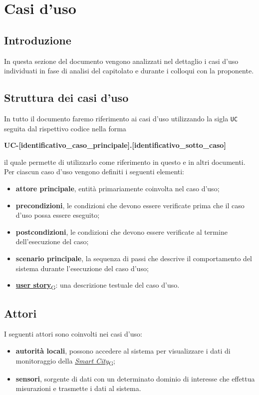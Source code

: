 \section{Casi d'uso}
\subsection{Introduzione}
In questa sezione del documento vengono analizzati nel dettaglio i casi d'uso individuati in fase di analisi del capitolato e durante i colloqui con la proponente.

\subsection{Struttura dei casi d'uso}
In tutto il documento faremo riferimento ai casi d'uso utilizzando la sigla \texttt{UC} seguita dal rispettivo codice nella forma
\begin{center}
	\textbf{UC-[identificativo\_caso\_principale].[identificativo\_sotto\_caso]}
\end{center}
il quale permette di utilizzarlo come riferimento in questo e in altri documenti.\\
Per ciascun caso d'uso vengono definiti i seguenti elementi:
\begin{itemize}
	\item \textbf{attore principale}, entità primariamente coinvolta nel caso d'uso;
	\item \textbf{precondizioni}, le condizioni che devono essere verificate prima che il caso d'uso possa essere eseguito;
	\item \textbf{postcondizioni}, le condizioni che devono essere verificate al termine dell'esecuzione del caso;
	\item \textbf{scenario principale}, la sequenza di passi che descrive il comportamento del sistema durante l'esecuzione del caso d'uso;
	\item \href{https://7last.github.io/docs/rtb/documentazione-interna/glossario\#user-story}{\textbf{user story}\textsubscript{G}}: una descrizione testuale del caso d'uso.
\end{itemize}

\subsection{Attori}
I seguenti attori sono coinvolti nei casi d'uso:
\begin{itemize}
	\item \textbf{autorità locali}, possono accedere al sistema per visualizzare i dati di monitoraggio della \href{https://7last.github.io/docs/rtb/documentazione-interna/glossario\#smart-city}{\textit{Smart City}\textsubscript{G}};
	\item \textbf{sensori}, sorgente di dati con un determinato dominio di interesse che effettua misurazioni e trasmette i dati al sistema.
\end{itemize}


